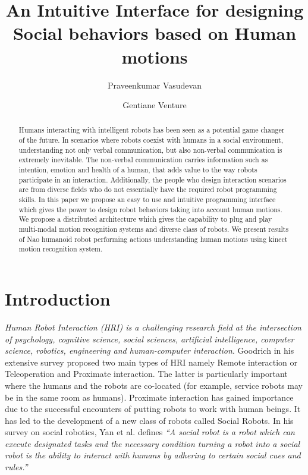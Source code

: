 \documentclass{llncs}
\title{An Intuitive Interface for designing Social behaviors based on Human motions}
\author{Praveenkumar Vasudevan\inst{1} \and Gentiane Venture\inst{2}}
\institute{Graduate Student, \'{E}cole Centrale de Nantes, Nantes, France,\\
\email{praveenv4k@gmail.com}
\and
Associate Professor, Tokyo University of Agriculture and Technology, Japan\\
\email{venture@cc.tuat.ac.jp}}
\begin{document}
\maketitle   
\begin{abstract}
	Humans interacting with intelligent robots has been seen as a potential game changer of the future. In scenarios where robots coexist with humans in a social environment, understanding not only verbal communication, but also non-verbal communication is extremely inevitable. The non-verbal communication carries information such as intention, emotion and health of a human, that adds value to the way robots participate in an interaction. Additionally, the people who design interaction scenarios are from diverse fields who do not essentially have the required robot programming skills. In this paper we propose an easy to use and intuitive programming interface which gives the power to design robot behaviors taking into account human motions. We propose a distributed architecture which gives the capability to plug and play multi-modal motion recognition systems and diverse class of robots. We present results of Nao humanoid robot performing actions understanding human motions using kinect motion recognition system.
\end{abstract}
%
\section{Introduction}
%
\emph{Human Robot Interaction (HRI) is a challenging research field at the intersection of psychology, cognitive science, social sciences, artificial intelligence, computer science, robotics, engineering and human-computer interaction}\cite{Dautenhahn2007}. Goodrich\cite{Goodrich:2007:HIS:1348099.1348100} in his extensive survey proposed two main types of HRI namely Remote interaction or Teleoperation and Proximate interaction. The latter is particularly important where the humans and the robots are co-located (for example, service robots may be in the same room as humans). Proximate interaction has gained importance due to the successful encounters of putting robots to work with human beings. It has led to the development of a new class of robots called Social Robots. In his survey on social robotics, Yan et al. \cite{Yan2014} defines \emph{“A social robot is a robot which can execute designated tasks and the necessary condition turning a robot into a social robot is the ability to interact with humans by adhering to certain social cues and rules.”}
\end{document}
